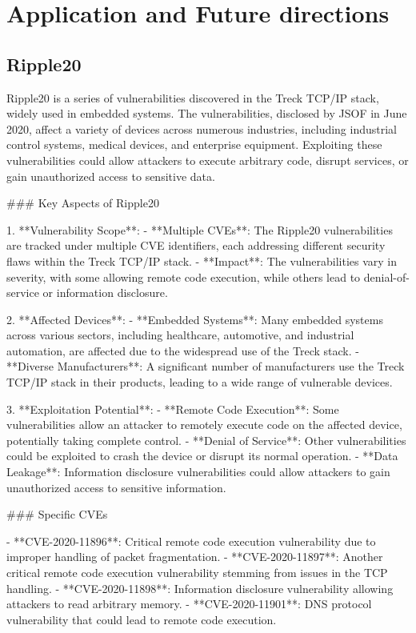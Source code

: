 \section{Application and Future directions}
\label{sec:App_future}

\subsection{Ripple20}
Ripple20 is a series of vulnerabilities discovered in the Treck TCP/IP stack, widely used in embedded systems. The vulnerabilities, disclosed by JSOF in June 2020, affect a variety of devices across numerous industries, including industrial control systems, medical devices, and enterprise equipment. Exploiting these vulnerabilities could allow attackers to execute arbitrary code, disrupt services, or gain unauthorized access to sensitive data.

### Key Aspects of Ripple20

1. **Vulnerability Scope**:
   - **Multiple CVEs**: The Ripple20 vulnerabilities are tracked under multiple CVE identifiers, each addressing different security flaws within the Treck TCP/IP stack.
   - **Impact**: The vulnerabilities vary in severity, with some allowing remote code execution, while others lead to denial-of-service or information disclosure.

2. **Affected Devices**:
   - **Embedded Systems**: Many embedded systems across various sectors, including healthcare, automotive, and industrial automation, are affected due to the widespread use of the Treck stack.
   - **Diverse Manufacturers**: A significant number of manufacturers use the Treck TCP/IP stack in their products, leading to a wide range of vulnerable devices.

3. **Exploitation Potential**:
   - **Remote Code Execution**: Some vulnerabilities allow an attacker to remotely execute code on the affected device, potentially taking complete control.
   - **Denial of Service**: Other vulnerabilities could be exploited to crash the device or disrupt its normal operation.
   - **Data Leakage**: Information disclosure vulnerabilities could allow attackers to gain unauthorized access to sensitive information.

### Specific CVEs

- **CVE-2020-11896**: Critical remote code execution vulnerability due to improper handling of packet fragmentation.
- **CVE-2020-11897**: Another critical remote code execution vulnerability stemming from issues in the TCP handling.
- **CVE-2020-11898**: Information disclosure vulnerability allowing attackers to read arbitrary memory.
- **CVE-2020-11901**: DNS protocol vulnerability that could lead to remote code execution.

